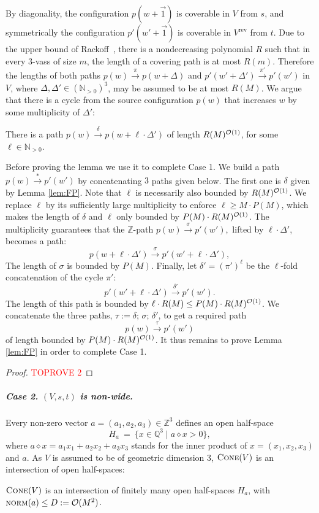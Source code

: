 \documentclass[a4paper, UKenglish, cleveref, autoref, thm-restate]{lipics-v2021}
\newcommand{\N}{\mathbb{N}}
\newcommand{\Z}{\mathbb{Z}}
\newcommand{\Q}{\mathbb{Q}}
\newcommand{\set}[1]{\{#1\}}
\newcommand{\setof}[2]{\set{#1 \mid #2}}
\newcommand{\trans}[1]{\stackrel{#1}{\longrightarrow}}
\newcommand{\tran}{\trans{*}}
\newcommand{\norm}{\textsc{norm}}
\renewcommand{\vec}[1]{\overrightarrow{#1}}
\newcommand{\OO}{{\cal O}}
\newcommand{\vass}{{\sc vass}\xspace}
\newcommand{\tvass}{\parvass 3}
\newcommand{\parvass}[1]{{$#1$-\vass}\xspace}
\newcommand{\para}[1]{\vspace{-3mm}\subparagraph*{\bf #1.}}
\newcommand{\rev}[1]{{#1}^{\text{rev}}}
\newcommand{\cone}[1]{\textsc{Cone}(#1)}
\newcommand{\Npos}{\N_{>0}}
\newcommand{\innprod}[2]{#1 \diamond #2} \newcommand{\pair}[2]{#1_{#2}}
\begin{document}
By diagonality, the configuration $p(w+\vec 1)$ is coverable in $V$ from $s$,
and symmetrically the configuration $p'(w' + \vec 1)$ is coverable in $\rev V$ from $t$.
Due to the upper bound of 
Rackoff~\cite[Lemma~3.4]{DBLP:journals/tcs/Rackoff78},
there is a nondecreasing polynomial $R$ such that in every \tvass of size $m$, the length of a covering
path is at most $R(m)$.
Therefore the lengths of 
both paths $p(w) \trans {\pi} p(w+\Delta)$  and $p'(w'+\Delta')\trans {\pi'} p'(w')$ in $V$, 
where $\Delta, \Delta' \in (\Npos)^3$,
may be assumed to be at most $R(M)$.
We argue that there is a cycle 
from the source configuration $p(w)$ 
that increases $w$ by some multiplicity of $\Delta'$:
\begin{lemma} \label{lem:FP}
There is a path $p(w) \trans \delta p(w+ \ell \cdot\Delta')$ of length $R(M)^{\OO(1)}$,
for some $\ell\in\Npos$.
\end{lemma}
Before proving the lemma we use it to complete Case 1.
We build a path $p(w) \tran p'(w')$ by concatenating $3$ paths given below.
The first one is  $\delta$
given by Lemma \ref{lem:FP}.
Note that $\ell$ is necessarily also bounded by $R(M)^{\OO(1)}$.
We replace $\ell$ by its sufficiently large multiplicity to enforce $\ell \geq M\cdot P(M)$, which
makes the length of $\delta$ and $\ell$ only bounded by $P(M) \cdot R(M)^{\OO(1)}$.
The multiplicity guarantees that the $\Z$-path 
$
p(w) \trans{\sigma} p'(w'), 
$
lifted by $\ell \cdot \Delta'$, becomes a path:
\[
p(w+\ell \cdot \Delta') \trans{\sigma} p'(w' + \ell\cdot\Delta'), 
\]
The length of $\sigma$ is bounded by $P(M)$.
Finally, let $\delta' = (\pi')^\ell$ be the $\ell$-fold concatenation of
the cycle $\pi'$:
\[
p'(w'+\ell\cdot\Delta') \trans{\delta'} p'(w').
\]
The length of this path is bounded by $\ell\cdot R(M) \leq P(M)\cdot R(M)^{\OO(1)}$.
We concatenate the three paths, $\tau := \delta; \, \sigma;\, \delta'$, to get a required path
\[
p(w) \trans{\tau} p'(w')
\]
of length bounded by $P(M) \cdot R(M)^{\OO(1)}$.
It thus remains to prove Lemma \ref{lem:FP} in order to complete Case 1.


\begin{proof}\textcolor{red}{TOPROVE 2}\end{proof}



\para{Case 2. $(V, s, t)$ is non-wide}

Every non-zero vector $a=(a_1, a_2, a_3)\in\Z^3$ defines an open half-space
\[
H_a \ = \ \setof{x\in\Q^3}{\innprod a x > 0},
\]
where $\innprod a x = a_1 x_1 + a_2 x_2 + a_3 x_3$ stands for the inner product of 
$x =(x_1, x_2, x_3)$ and $a$.
As $V$ is assumed to be of geometric dimension 3,
$\cone V$  is an intersection of open half-spaces:
\begin{claim} \label{claim:a}
$\cone V$ is an intersection of finitely many open half-spaces $H_a$, with $\norm(a) \leq D := \OO(M^2)$.
\end{claim}
\end{document}
